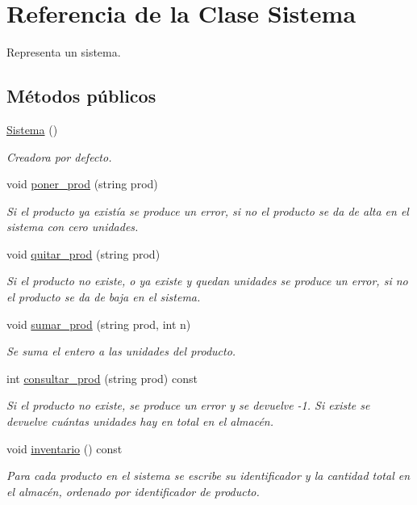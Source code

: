 \hypertarget{class_sistema}{}\section{Referencia de la Clase Sistema}
\label{class_sistema}


Representa un sistema.  


\subsection*{Métodos públicos}
\begin{DoxyCompactItemize}
\item 
\hyperlink{class_sistema_a815b07845ef6b03247b239333fe75e28}{Sistema} ()
\begin{DoxyCompactList}\small\item\em Creadora por defecto. \end{DoxyCompactList}\item 
void \hyperlink{class_sistema_af23b15605b8c26c79b1e195eb164a06f}{poner\+\_\+prod} (string prod)
\begin{DoxyCompactList}\small\item\em Si el producto ya existía se produce un error, si no el producto se da de alta en el sistema con cero unidades. \end{DoxyCompactList}\item 
void \hyperlink{class_sistema_a9e35414af566cf486d09504014a26f40}{quitar\+\_\+prod} (string prod)
\begin{DoxyCompactList}\small\item\em Si el producto no existe, o ya existe y quedan unidades se produce un error, si no el producto se da de baja en el sistema. \end{DoxyCompactList}\item 
void \hyperlink{class_sistema_a313b296b88c2991348ce353b1e7fb166}{sumar\+\_\+prod} (string prod, int n)
\begin{DoxyCompactList}\small\item\em Se suma el entero a las unidades del producto. \end{DoxyCompactList}\item 
int \hyperlink{class_sistema_a6e61a7675d9d4c9f5fed403bd29ea021}{consultar\+\_\+prod} (string prod) const 
\begin{DoxyCompactList}\small\item\em Si el producto no existe, se produce un error y se devuelve -\/1. Si existe se devuelve cuántas unidades hay en total en el almacén. \end{DoxyCompactList}\item 
void \hyperlink{class_sistema_ae56405e21fcc545cb27b0a415752ced4}{inventario} () const 
\begin{DoxyCompactList}\small\item\em Para cada producto en el sistema se escribe su identificador y la cantidad total en el almacén, ordenado por identificador de producto. \end{DoxyCompactList}\end{DoxyCompactItemize}
